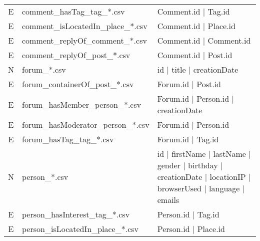 \begin{table}[htb]
\begin{tabular}{|c|p{4.6cm}|p{11.4cm}|}
        E                       & comment\_hasTag\_tag\_*.csv             & Comment.id | Tag.id                                                                                         \\ 
        E                       & comment\_isLocatedIn\_place\_*.csv      & Comment.id | Place.id                                                                                       \\ 
        E                       & comment\_replyOf\_comment\_*.csv        & Comment.id | Comment.id                                                                                     \\ 
        E                       & comment\_replyOf\_post\_*.csv           & Comment.id | Post.id                                                                                        \\
		\hline
        N                       & forum\_*.csv                            & id | title | creationDate                                                                                   \\
        E                       & forum\_containerOf\_post\_*.csv         & Forum.id | Post.id                                                                                          \\
        E                       & forum\_hasMember\_person\_*.csv         & Forum.id | Person.id | creationDate                                                                         \\
        E                       & forum\_hasModerator\_person\_*.csv      & Forum.id | Person.id                                                                                        \\
        E                       & forum\_hasTag\_tag\_*.csv               & Forum.id | Tag.id                                                                                           \\
		\hline
        N                       & person\_*.csv                           & id | firstName | lastName | gender | birthday | creationDate | locationIP | browserUsed | language | emails \\
        E                       & person\_hasInterest\_tag\_*.csv         & Person.id | Tag.id                                                                                          \\
        E                       & person\_isLocatedIn\_place\_*.csv       & Person.id | Place.id                                                                                        \\

\end{tabular}
\end{table}
